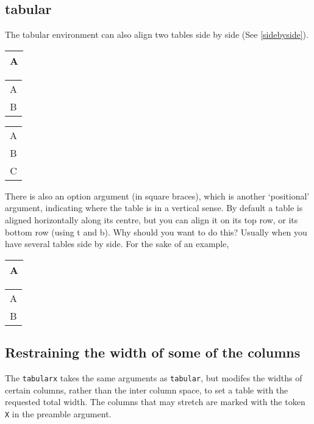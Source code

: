 \begin{multicols}{2}
\section{tabular}

The tabular environment can also align two tables side by side (See \ref{sidebyside}).


\begin{tabular}[t]{|c|}
\hline A \\ \hline
\end{tabular}
\begin{tabular}[t]{|c|}
\hline A \\ B \\ \hline
\end{tabular}
\begin{tabular}[t]{|c|}
\hline A \\ B \\ C\\\hline
\end{tabular}
\label{sidebyside}


There is also an option argument (in square braces), which
is another ‘positional’ argument, indicating where the table is
in a vertical sense. By default a table is aligned horizontally
along its centre, but you can align it on its top row, or its bottom
row (using t and b). Why should you want to do this?
Usually when you have several tables side by side. For the
sake of an example,

\begin{Code}
\begin{tabular}[t]{|c|}
\hline A \\ \hline
\end{tabular}
\begin{tabular}[t]{|c|}
\hline A \\ B \\ \hline
\end{tabular}
\end{Code}




\subsection{Restraining the width of some of the columns}

The \texttt{tabularx} takes the same arguments
as \texttt{tabular}, but modifes the widths of certain columns, rather than
the inter column space, to set a table with the requested total width. The
columns that may stretch are marked with the token \texttt{X} in the preamble
argument.




\end{multicols}
